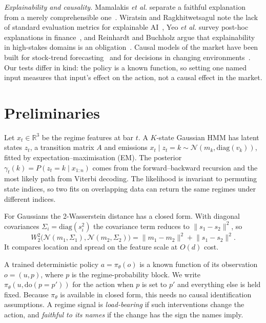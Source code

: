 \documentclass[conference]{IEEEtran}
\newcommand{\Wtwo}{W_2}
\newcommand{\R}{\mathbb{R}}
\begin{document}
\emph{Explainability and causality.} Mamalakis \emph{et al.} separate a faithful explanation from a merely comprehensible one~\cite{mamalakis2025enigma}. Wiratsin and Ragkhitwetsagul note the lack of standard evaluation metrics for explainable AI~\cite{wiratsin2025xai}, Yeo \emph{et al.} survey post-hoc explanations in finance~\cite{yeo2025financial}, and Reinhardt and Buchholz argue that explainability in high-stakes domains is an obligation~\cite{reinhardt2025xai}. Causal models of the market have been built for stock-trend forecasting~\cite{qiu2025cistf} and for decisions in changing environments~\cite{katamaneni2025causal}. Our tests differ in kind: the policy is a known function, so setting one named input measures that input's effect on the action, not a causal effect in the market.

\section{Preliminaries}
Let $x_t\in\R^3$ be the regime features at bar $t$. A $K$-state Gaussian HMM has latent states $z_t$, a transition matrix $A$ and emissions $x_t\mid z_t=k\sim\mathcal N(m_k,\mathrm{diag}(v_k))$, fitted by expectation--maximisation (EM). The posterior $\gamma_t(k)=P(z_t=k\mid x_{1:n})$ comes from the forward--backward recursion and the most likely path from Viterbi decoding. The likelihood is invariant to permuting state indices, so two fits on overlapping data can return the same regimes under different indices.

For Gaussians the 2-Wasserstein distance has a closed form. With diagonal covariances $\Sigma_i=\mathrm{diag}(s_i^2)$ the covariance term reduces to $\lVert s_1-s_2\rVert^2$, so
\begin{equation}
\Wtwo^2\bigl(\mathcal N(m_1,\Sigma_1),\mathcal N(m_2,\Sigma_2)\bigr)=\lVert m_1-m_2\rVert^2+\lVert s_1-s_2\rVert^2 .
\label{eq:w2diag}
\end{equation}
It compares location and spread on the feature scale at $O(d)$ cost.

A trained deterministic policy $a=\pi_\theta(o)$ is a known function of its observation $o=(u,p)$, where $p$ is the regime-probability block. We write $\pi_\theta(u,\mathrm{do}(p{=}p'))$ for the action when $p$ is set to $p'$ and everything else is held fixed. Because $\pi_\theta$ is available in closed form, this needs no causal identification assumptions. A regime signal is \emph{load-bearing} if such interventions change the action, and \emph{faithful to its names} if the change has the sign the names imply.
\end{document}

